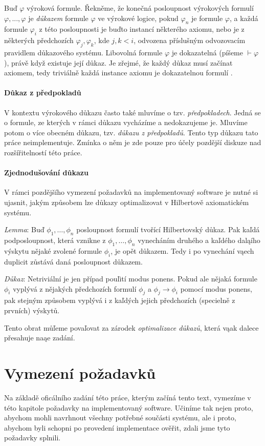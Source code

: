 \documentclass[thesis=B,czech]{FITthesis}[2012/06/26]
\begin{document}
Buď $\varphi$ výroková formule. Řekněme, že konečná posloupnost výrokových formulí $\varphi , ..., \varphi$ je \emph{důkazem} formule $\varphi$ ve výrokové logice, pokud $\varphi_n$ je formule $\varphi$, a každá formule $\varphi_i$ z této posloupnosti je buďto instancí některého axiomu, nebo je z některých předchozích $\varphi_j, \varphi_k$, kde $j, k < i$, odvozena příslušným odvozovacím pravidlem důkazového systému. Libovolná formule $\varphi$ je dokazatelná (píšeme $\vdash\varphi$), právě když existuje její důkaz. Je zřejmé, že každý důkaz musí začínat axiomem, tedy triviálně každá instance axiomu je dokazatelnou formulí \cite{logika}.

\subsubsection{Důkaz z předpokladů}
V kontextu výrokového důkazu často také mluvíme o tzv. \emph{předpokladech}. Jedná se o formule, ze kterých v rámci důkazu vycházíme a nedokazujeme je. Mluvíme potom o více obecném důkazu, tzv. \emph{důkazu z předpokladů}. Tento typ důkazu tato práce neimplementuje. Zmínka o něm je zde pouze pro účely pozdější diskuze nad rozšířitelností této práce.

\subsubsection{Zjednodušování důkazu}
V rámci pozdějšího vymezení požadavků na implementovaný software je nutné si ujasnit, jakým způsobem lze důkazy optimalizovat v Hilbertově axiomatickém systému.

{\em Lemma\/}:
Buď $\phi_1, \dots, \phi_n$ posloupnost formulí
tvořící Hilbertovský důkaz. Pak kaľdá podposloupnost,
která vznikne z $\phi_1, \dots, \phi_n$ vynecháním druhého
a kaľdého daląího výskytu nějaké zvolené formule $\phi_i$,
je opět důkazem. Tedy i po vynechání vąech duplicit
zůstává daná posloupnost důkazem.

{\em Důkaz\/}:
Netriviální je jen případ pouľití modus ponens.
Pokud ale nějaká formule $\phi_i$ vyplývá z nějakých
předchozích formulí $\phi_j$ a $\phi_j \to \phi_i$
pomocí modus ponens, pak stejným způsobem vyplývá
i z kaľdých jejich předchozích (specielně z prvních) výskytů.

\bigskip
Tento obrat můľeme povaľovat za zárodek {\em optimalizace důkazů\/},
která vąak dalece přesahuje naąe zadání.

%
%
%

\chapter{Vymezení požadavků}
Na základě oficálního zadání této práce, kterým začíná tento text, vymezíme v této kapitole požadavky na implementovaný software. Učiníme tak nejen proto, abychom mohli navrhnout všechny potřebné součásti systému, ale i proto, abychom byli schopni po provedení implementace ověřit, zdali jsme tyto požadavky splnili.
\end{document}
